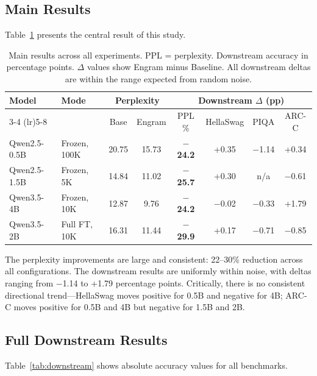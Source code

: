 \documentclass{article}
\begin{document}
\subsection{Main Results}

Table~\ref{tab:main} presents the central result of this study.

\begin{table}[H]
\centering
\caption{Main results across all experiments. PPL = perplexity. Downstream accuracy in percentage points. $\Delta$ values show Engram minus Baseline. All downstream deltas are within the range expected from random noise.}
\label{tab:main}
\small
\begin{tabular}{@{}llcccccc@{}}
\toprule
\multirow{2}{*}{Model} & \multirow{2}{*}{Mode} & \multicolumn{2}{c}{Perplexity} & \multicolumn{4}{c}{Downstream $\Delta$ (pp)} \\
\cmidrule(lr){3-4} \cmidrule(lr){5-8}
 & & Base & Engram & PPL \% & HellaSwag & PIQA & ARC-C \\
\midrule
Qwen2.5-0.5B & Frozen, 100K & 20.75 & 15.73 & \textbf{$-$24.2} & +0.35 & $-$1.14 & +0.34 \\
Qwen2.5-1.5B & Frozen, 5K & 14.84 & 11.02 & \textbf{$-$25.7} & +0.30 & n/a & $-$0.61 \\
Qwen3.5-4B & Frozen, 10K & 12.87 & 9.76 & \textbf{$-$24.2} & $-$0.02 & $-$0.33 & +1.79 \\
Qwen3.5-2B & Full FT, 10K & 16.31 & 11.44 & \textbf{$-$29.9} & +0.17 & $-$0.71 & $-$0.85 \\
\bottomrule
\end{tabular}
\end{table}

The perplexity improvements are large and consistent: 22--30\% reduction across all configurations. The downstream results are uniformly within noise, with deltas ranging from $-$1.14 to +1.79 percentage points. Critically, there is no consistent directional trend---HellaSwag moves positive for 0.5B and negative for 4B; ARC-C moves positive for 0.5B and 4B but negative for 1.5B and 2B.

\subsection{Full Downstream Results}

Table~\ref{tab:downstream} shows absolute accuracy values for all benchmarks.
\end{document}
